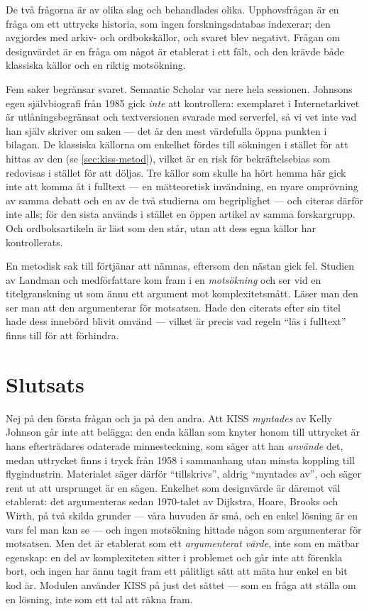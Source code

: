 De två frågorna är av olika slag och behandlades olika.  Upphovsfrågan är en
fråga om ett uttrycks historia, som ingen forskningsdatabas indexerar; den
avgjordes med arkiv- och ordbokskällor, och svaret blev negativt.  Frågan om
designvärdet är en fråga om något är etablerat i ett fält, och den krävde
både klassiska källor och en riktig motsökning.

Fem saker begränsar svaret.  Semantic Scholar var nere hela sessionen.
Johnsons egen självbiografi från 1985
gick \emph{inte} att kontrollera: exemplaret i Internetarkivet är
utlåningsbegränsat och textversionen svarade med serverfel, så vi vet inte
vad han själv skriver om saken --- det är den mest värdefulla öppna punkten
i bilagan.  De klassiska källorna om enkelhet fördes till sökningen i
stället för att hittas av den (se \cref{sec:kiss-metod}), vilket är en
risk för bekräftelsebias som redovisas i stället för att döljas.
Tre källor som skulle ha hört hemma här gick inte att komma åt i fulltext
--- en mätteoretisk invändning, en nyare omprövning av samma debatt och en
av de två studierna om begriplighet --- och citeras därför inte alls; för
den sista används i stället en öppen artikel av samma forskargrupp.  Och
ordboksartikeln är läst som den står, utan att dess egna källor har
kontrollerats.

En metodisk sak till förtjänar att nämnas, eftersom den nästan gick fel.
Studien av Landman och medförfattare kom fram i en \emph{motsökning} och ser
vid en titelgranskning ut som ännu ett argument mot komplexitetsmått.  Läser
man den ser man att den argumenterar för motsatsen.  Hade den citerats efter
sin titel hade dess innebörd blivit omvänd --- vilket är precis vad regeln
\enquote{läs i fulltext} finns till för att förhindra.

\section{Slutsats}
\label{sec:kiss-slutsats}

Nej på den första frågan och ja på den andra.  Att KISS \emph{myntades} av
Kelly Johnson går inte att belägga: den enda källan som knyter honom till
uttrycket är hans efterträdares odaterade minnesteckning, som säger att han
\emph{använde} det, medan uttrycket finns i tryck från 1958 i sammanhang
utan minsta koppling till flygindustrin.  Materialet säger därför
\enquote{tillskrivs}, aldrig \enquote{myntades av}, och säger rent ut att
ursprunget är en sägen.  Enkelhet som designvärde är däremot väl etablerat:
det argumenteras sedan 1970-talet av Dijkstra, Hoare, Brooks och Wirth, på
två skilda grunder --- våra huvuden är små, och en enkel lösning är en vars
fel man kan se --- och ingen motsökning hittade någon som argumenterar för
motsatsen.  Men det är etablerat som ett \emph{argumenterat värde}, inte som
en mätbar egenskap: en del av komplexiteten sitter i problemet och går inte
att förenkla bort, och ingen har ännu tagit fram ett pålitligt sätt att mäta
hur enkel en bit kod är.  Modulen använder KISS på just det sättet --- som
en fråga att ställa om en lösning, inte som ett tal att räkna fram.

